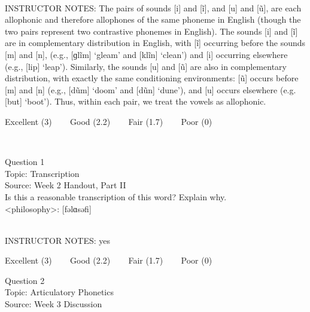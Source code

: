 \documentclass[12pt]{article}
\begin{document}
~\\
INSTRUCTOR NOTES: The pairs of sounds [i] and [ĩ], and [u] and [ũ], are each allophonic and therefore allophones of the same phoneme in English (though the two pairs represent two contrastive phonemes in English). The sounds [i] and [ĩ] are in complementary distribution in English, with [ĩ] occurring before the sounds [m] and [n], (e.g., [ɡlĩm] ‘gleam’ and [klĩn] ‘clean’) and [i] occurring elsewhere (e.g., [lip] ‘leap’). Similarly, the sounds [u] and [ũ] are also in complementary distribution, with exactly the same conditioning environments: [ũ] occurs before [m] and [n] (e.g., [dũm] ‘doom’ and [dũn] ‘dune’), and [u] occurs elsewhere (e.g. [but] ‘boot’). Thus, within each pair, we treat the vowels as allophonic. 


\vfill
Excellent (3) ~~~ Good (2.2) ~~~ Fair (1.7) ~~~ Poor (0)
\newpage

\begin{center}
\textbf{{\color{red}{\HUGE END OF EXAM}}}\\

\end{center}
\newpage

\begin{center}
\textbf{{\color{blue}{\HUGE START OF EXAM\\}}}

\textbf{{\color{blue}{\HUGE Student ID: 55084\\}}}

\textbf{{\color{blue}{\HUGE \\}}}

\end{center}
\newpage

{\large Question 1}\\

Topic: Transcription\\
Source: Week 2 Handout, Part II\\

Is this a reasonable transcription of this word? Explain why.\\

<philosophy>: {[fəlɑsəfi]}


~\\
INSTRUCTOR NOTES: yes


\vfill
Excellent (3) ~~~ Good (2.2) ~~~ Fair (1.7) ~~~ Poor (0)
\newpage

{\large Question 2}\\

Topic: Articulatory Phonetics\\
Source: Week 3 Discussion\\
\end{document}
